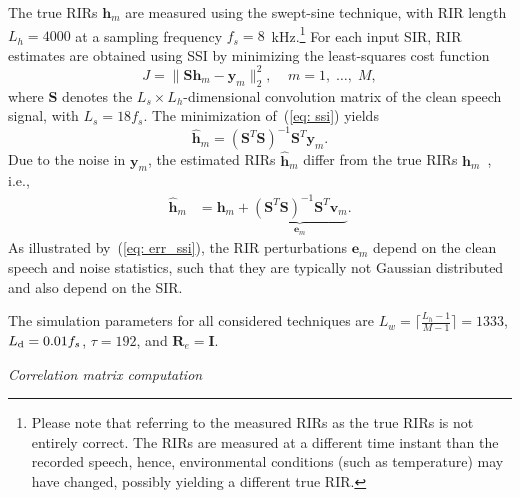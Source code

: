 \documentclass[10pt]{IEEEtran}
\begin{document}
{{The true RIRs $\mathbf{h}_m$ are measured using the swept-sine technique, with RIR length $L_h = 4000$ at a sampling frequency $f_s = 8$~kHz.\footnote{Please note that referring to the measured RIRs as the true RIRs is not entirely correct. The RIRs are measured at a different time instant than the recorded speech, hence, environmental conditions (such as temperature) may have changed, possibly yielding a different true RIR.}
For each input SIR, RIR estimates are obtained using SSI by minimizing the least-squares cost function~\cite{Lim_ITASLP_2014}
\begin{equation}
  \label{eq: ssi}
  J = \|\mathbf{S}\mathbf{h}_m-\mathbf{y}_m\|_2^2, \; \; \; \; m = 1, \; \ldots, \; M,
\end{equation}
where $\mathbf{S}$ denotes the $L_s \times L_h$-dimensional convolution matrix of the clean speech signal, with $L_s = 18 f_s$.
The minimization of~(\ref{eq: ssi}) yields
\begin{equation}
\hat{\mathbf{h}}_m = (\mathbf{S}^T\mathbf{S})^{-1}\mathbf{S}^T\mathbf{y}_m.
\end{equation}
Due to the noise in $\mathbf{y}_m$, the estimated RIRs $\hat{\mathbf{h}}_m$ differ from the true RIRs $\mathbf{h}_m$~\cite{Lim_ITASLP_2014}, i.e.,
\begin{align}
\label{eq: err_ssi}
\hat{\mathbf{h}}_m & = \mathbf{h}_m + \underbrace{(\mathbf{S}^T\mathbf{S})^{-1}\mathbf{S}^T\mathbf{v}_m}_{\mathbf{e}_m}.
\end{align}
As illustrated by~(\ref{eq: err_ssi}), the RIR perturbations $\mathbf{e}_m$ depend on the clean speech and noise statistics, such that they are typically not Gaussian distributed and also depend on the SIR.

The simulation parameters for all considered techniques are $L_w = \lceil{\frac{L_h-1}{M-1}\rceil} = 1333$, $L_{\rm{d}} = 0.01 f_s$, $\tau = 192$, and $\mathbf{R}_{e} = \mathbf{I}$.
}}
\vskip 5pt

\textit{Correlation matrix computation} 

\vskip 5pt
\end{document}
